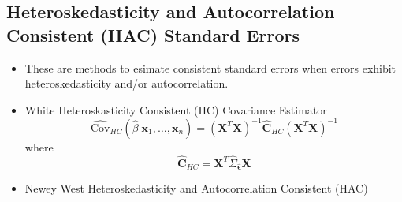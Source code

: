 \documentclass[11pt]{article}
\begin{document}
\subsection{Heteroskedasticity and Autocorrelation Consistent (HAC) Standard Errors}
\begin{itemize}
    \item These are methods to esimate consistent standard errors when errors exhibit 
    heteroskedasticity and/or autocorrelation.
    \item White Heteroskasticity Consistent (HC) Covariance Estimator
    \[
    \hat{\text{Cov}}_{HC} (\hat{\beta} | \boldsymbol{x}_1, \ldots, \boldsymbol{x}_n) = 
    {(\boldsymbol{X}^T \boldsymbol{X})}^{-1} \hat{\boldsymbol{C}}_{HC} {(\boldsymbol{X}^T 
    \boldsymbol{X})}^{-1}
    \]
    where 
    \[
    \hat{\boldsymbol{C}}_{HC} = \boldsymbol{X}^T \hat{\Sigma}_{\hat{\boldsymbol{\epsilon}}}
    \boldsymbol{X}
    \]
    \item Newey West Heteroskedasticity and Autocorrelation Consistent (HAC)
\end{itemize}
\end{document}
